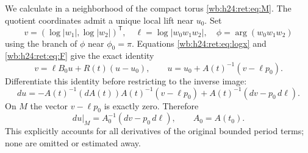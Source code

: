 We calculate in a neighborhood of the compact torus \eqref{wb:h24:ret:eq:M}.
The quotient coordinates admit a unique local lift near \(u_0\).
Set
\[
 v=(\log|w_1|,\log|w_2|)^{\mathsf T},\quad
 \ell=\log|w_0w_1w_2|,\quad
 \phi=\arg(w_0w_1w_2)
\]
using the branch of \(\phi\) near \(\phi_0=\pi\).
Equations \eqref{wb:h24:ret:eq:logx} and \eqref{wb:h24:ret:eq:F} give the exact identity
\begin{equation}
 v=\ell B_0u+R(t)(u-u_0),\qquad
 u=u_0+A(t)^{-1}(v-\ell p_0).
 \label{wb:h24:ret:eq:exact-u}
\end{equation}
Differentiate this identity before restricting to the inverse image:
\begin{equation}
 du=-A(t)^{-1}(dA(t))A(t)^{-1}(v-\ell p_0)
        +A(t)^{-1}(dv-p_0\,d\ell).
 \label{wb:h24:ret:eq:full-derivative}
\end{equation}
On \(M\) the vector \(v-\ell p_0\) is exactly zero.  Therefore
\begin{equation}
 du|_M=A_0^{-1}(dv-p_0\,d\ell),\qquad A_0=A(t_0).
 \label{wb:h24:ret:eq:derivative-on-M}
\end{equation}
This explicitly accounts for all derivatives of the original bounded
period terms; none are omitted or estimated away.

